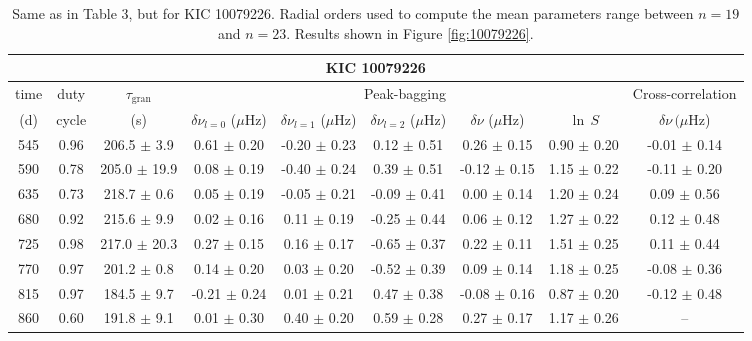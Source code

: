 \documentclass[twocolumn]{aastex61}%
\begin{document}
\begin{table*}[ht]\centering\fontsize{9.}{7.}\selectfont
\begin{tabular}{ccc|ccccc|c}
\multicolumn{9}{c}{KIC 10079226}\\ \hline\hline
time & duty & $\tau_\text{gran}$ &\multicolumn{5}{c|}{Peak-bagging}&Cross-correlation\\
(d)& cycle & (s)&$\delta\nu_{l=0}$ ($\mu$Hz) & $\delta\nu_{l=1}$ ($\mu$Hz) & $\delta\nu_{l=2}$ ($\mu$Hz) & $\delta\nu$ ($\mu$Hz)& $\ln\,S$ & $\delta\nu\,(\mu$Hz)\\\hline
545 & 0.96 & 206.5 $\pm$ 3.9 & 0.61 $\pm$ 0.20 & -0.20 $\pm$ 0.23 & 0.12 $\pm$ 0.51 & 0.26 $\pm$ 0.15 & 0.90 $\pm$ 0.20 & -0.01 $\pm$ 0.14\\
590 & 0.78 & 205.0 $\pm$ 19.9 & 0.08 $\pm$ 0.19 & -0.40 $\pm$ 0.24 & 0.39 $\pm$ 0.51 & -0.12 $\pm$ 0.15 & 1.15 $\pm$ 0.22 & -0.11 $\pm$ 0.20\\
635 & 0.73 & 218.7 $\pm$ 0.6 & 0.05 $\pm$ 0.19 & -0.05 $\pm$ 0.21 & -0.09 $\pm$ 0.41 & 0.00 $\pm$ 0.14 & 1.20 $\pm$ 0.24 & 0.09 $\pm$ 0.56\\
680 & 0.92 & 215.6 $\pm$ 9.9 & 0.02 $\pm$ 0.16 & 0.11 $\pm$ 0.19 & -0.25 $\pm$ 0.44 & 0.06 $\pm$ 0.12 & 1.27 $\pm$ 0.22 & 0.12 $\pm$ 0.48\\
725 & 0.98 & 217.0 $\pm$ 20.3 & 0.27 $\pm$ 0.15 & 0.16 $\pm$ 0.17 & -0.65 $\pm$ 0.37 & 0.22 $\pm$ 0.11 & 1.51 $\pm$ 0.25 & 0.11 $\pm$ 0.44\\
770 & 0.97 & 201.2 $\pm$ 0.8 & 0.14 $\pm$ 0.20 & 0.03 $\pm$ 0.20 & -0.52 $\pm$ 0.39 & 0.09 $\pm$ 0.14 & 1.18 $\pm$ 0.25 & -0.08 $\pm$ 0.36\\
815 & 0.97 & 184.5 $\pm$ 9.7 & -0.21 $\pm$ 0.24 & 0.01 $\pm$ 0.21 & 0.47 $\pm$ 0.38 & -0.08 $\pm$ 0.16 & 0.87 $\pm$ 0.20 & -0.12 $\pm$ 0.48\\
860 & 0.60 & 191.8 $\pm$ 9.1 & 0.01 $\pm$ 0.30 & 0.40 $\pm$ 0.20 & 0.59 $\pm$ 0.28 & 0.27 $\pm$ 0.17 & 1.17 $\pm$ 0.26 & --\\
\end{tabular}
\caption{Same as in Table 3, but for KIC 10079226. Radial orders used to compute the mean parameters range between $n=19$ and $n=23$. Results shown in Figure \ref{fig:10079226}.}\label{tab:10079226}
\end{table*}
\end{document}
